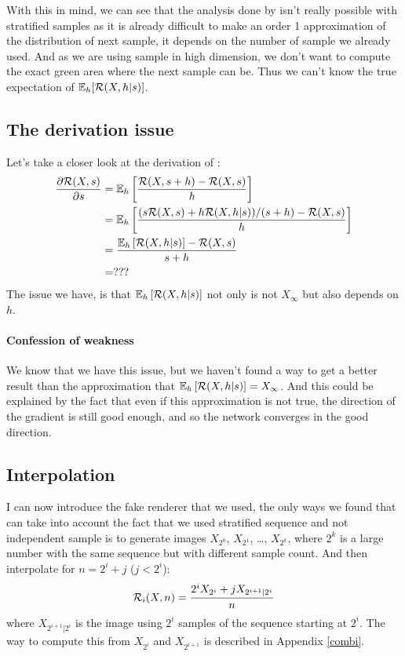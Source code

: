 \documentclass{classeENS}
\begin{document}
\par With this in mind, we can see that the analysis done by \cite{10.1145/3550454.3555515}
isn't really possible with stratified samples as it is already difficult to make an order 1 approximation of 
the distribution of next sample, it depends on the number of sample we already used. 
And as we are using sample in high dimension, we don't want to compute the exact green 
area where the next sample can be. Thus we can't know the true expectation of $\mathbb E_h[\mathcal R(X,h | s)]$.

\subsection{The derivation issue}

Let's take a closer look at the derivation of \label{eq:4}:
\begin{align*}
    \label{eq:4}
 \frac{\partial \mathcal R(X,s)}{\partial s} & = \mathbb E_h \left [\frac{\mathcal R(X,s+h) - \mathcal R(X,s)}{h} \right ] \\
    & = \mathbb E_h \left [\frac{(s\mathcal R(X,s) + h\mathcal R(X,h | s))/(s+h) - \mathcal R(X,s)}{h}\right ] \\
    & = \frac{\mathbb E_h \left [\mathcal R(X,h | s) \right ] - \mathcal R(X,s)}{s+h} \\
    & = ???
\end{align*}
The issue we have, is that $\mathbb E_h \left [\mathcal R(X,h | s) \right ]$ not only is not $X_\infty$ 
but also depends on $h$.

\paragraph*{Confession of weakness} We know that we have this issue, but we haven't found 
a way to get a better result than the approximation that 
$\mathbb E_h \left [\mathcal R(X,h | s) \right ] = X_\infty$. And this could be explained by the fact that 
even if this approximation is not true, the direction of the gradient is still good 
enough, and so the network converges in the good direction.

\subsection{Interpolation}

I can now introduce the fake renderer that we used, the only ways we found that can
take into account the fact that we used stratified sequence and not independent sample
is to generate images $X_{2^0}$, $X_{2^1}$, \dots, $X_{2^k}$, where $2^k$ is a large number
with the same sequence but with different sample count. And then interpolate for 
$n = 2^i + j$ ($j < 2^i$):
\begin{equation}
    \label{eq:5}
    \mathcal R_i(X,n) = \frac{2^i X_{2^i} + j X_{2^{i+1} | 2^i}}{n}
\end{equation}
where $X_{2^{i+1} | 2^i}$ is the image using $2^i$ samples of the sequence starting at 
$2^i$. The way to compute this from $X_{2^i}$ and $X_{2^{i+1}}$ is described in Appendix \ref{combi}.
\end{document}
